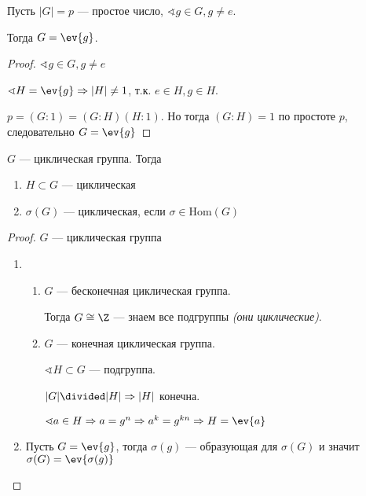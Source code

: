 \begin{lemma}
    Пусть \(|G| = p\) --- простое число, \(\sphericalangle g \in G, g \neq e\).

    Тогда \(G = \ev{g}\).
\end{lemma}
\begin{proof}
    \(\sphericalangle g \in G, g \neq e\)

    \(\sphericalangle H = \ev{g} \Rightarrow |H| \neq 1\), т.к. \(e \in H, g \in H\).

    \(p = (G : 1) = (G : H)(H : 1)\). Но тогда \((G : H) = 1\) по простоте \(p\), следовательно \(G = \ev{g}\)
\end{proof}

\begin{lemma}
    \(G\) --- циклическая группа. Тогда
    \begin{enumerate}
        \item \(H \subset G\) --- циклическая
        \item \(\sigma(G)\) --- циклическая, если \(\sigma \in \mathrm{Hom}(G)\)
    \end{enumerate}
\end{lemma}
\begin{proof}
    \(G\) --- циклическая группа

    \begin{enumerate}
        \item \begin{enumerate}
                  \item \(G\) --- бесконечная циклическая группа.

                        Тогда \(G \cong \Z\) --- знаем все подгруппы \textit{(они циклические)}.
                  \item \(G\) --- конечная циклическая группа.

                        \(\sphericalangle H \subset G\) --- подгруппа.

                        \(|G| \divided |H| \Rightarrow |H|\) конечна.

                        \(\sphericalangle a \in H \Rightarrow a = g^n \Rightarrow a^k = g^{k n} \Rightarrow H = \ev{a}\)
              \end{enumerate}
        \item Пусть \(G = \ev{g}\), тогда \(\sigma(g)\) --- образующая для \(\sigma(G)\) и значит \(\sigma(G) = \ev{\sigma(g)}\)
    \end{enumerate}
\end{proof}


